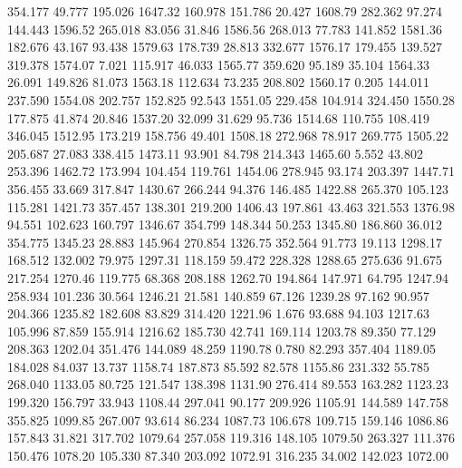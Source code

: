  354.177   49.777  195.026      1647.32
 160.978  151.786   20.427      1608.79
 282.362   97.274  144.443      1596.52
 265.018   83.056   31.846      1586.56
 268.013   77.783  141.852      1581.36
 182.676   43.167   93.438      1579.63
 178.739   28.813  332.677      1576.17
 179.455  139.527  319.378      1574.07
   7.021  115.917   46.033      1565.77
 359.620   95.189   35.104      1564.33
  26.091  149.826   81.073      1563.18
 112.634   73.235  208.802      1560.17
   0.205  144.011  237.590      1554.08
 202.757  152.825   92.543      1551.05
 229.458  104.914  324.450      1550.28
 177.875   41.874   20.846      1537.20
  32.099   31.629   95.736      1514.68
 110.755  108.419  346.045      1512.95
 173.219  158.756   49.401      1508.18
 272.968   78.917  269.775      1505.22
 205.687   27.083  338.415      1473.11
  93.901   84.798  214.343      1465.60
   5.552   43.802  253.396      1462.72
 173.994  104.454  119.761      1454.06
 278.945   93.174  203.397      1447.71
 356.455   33.669  317.847      1430.67
 266.244   94.376  146.485      1422.88
 265.370  105.123  115.281      1421.73
 357.457  138.301  219.200      1406.43
 197.861   43.463  321.553      1376.98
  94.551  102.623  160.797      1346.67
 354.799  148.344   50.253      1345.80
 186.860   36.012  354.775      1345.23
  28.883  145.964  270.854      1326.75
 352.564   91.773   19.113      1298.17
 168.512  132.002   79.975      1297.31
 118.159   59.472  228.328      1288.65
 275.636   91.675  217.254      1270.46
 119.775   68.368  208.188      1262.70
 194.864  147.971   64.795      1247.94
 258.934  101.236   30.564      1246.21
  21.581  140.859   67.126      1239.28
  97.162   90.957  204.366      1235.82
 182.608   83.829  314.420      1221.96
   1.676   93.688   94.103      1217.63
 105.996   87.859  155.914      1216.62
 185.730   42.741  169.114      1203.78
  89.350   77.129  208.363      1202.04
 351.476  144.089   48.259      1190.78
   0.780   82.293  357.404      1189.05
 184.028   84.037   13.737      1158.74
 187.873   85.592   82.578      1155.86
 231.332   55.785  268.040      1133.05
  80.725  121.547  138.398      1131.90
 276.414   89.553  163.282      1123.23
 199.320  156.797   33.943      1108.44
 297.041   90.177  209.926      1105.91
 144.589  147.758  355.825      1099.85
 267.007   93.614   86.234      1087.73
 106.678  109.715  159.146      1086.86
 157.843   31.821  317.702      1079.64
 257.058  119.316  148.105      1079.50
 263.327  111.376  150.476      1078.20
 105.330   87.340  203.092      1072.91
 316.235   34.002  142.023      1072.00
